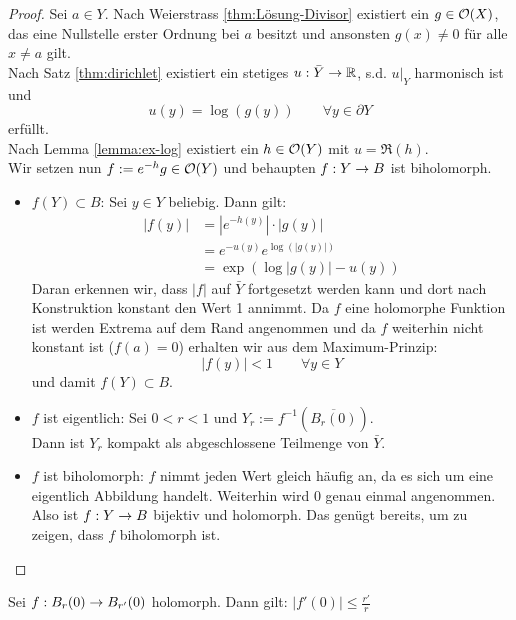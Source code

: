 \begin{proof}
  Sei $a \in Y$. Nach Weierstrass \ref{thm:Lösung-Divisor} existiert ein $g \in
  \mathcal{O}(X)$, das eine Nullstelle erster Ordnung bei $a$ besitzt und
  ansonsten $g(x) \neq 0$ für alle $x \neq a$ gilt. \\
  Nach Satz \ref{thm:dirichlet} existiert ein stetiges $u: \bar Y \rightarrow
  \mathbb{R}$, s.d. $u|_Y$ harmonisch ist und
  \[
  u(y) = \log(g(y)) \qquad \forall y \in \partial Y
  \]
  erfüllt. \\
  Nach Lemma \ref{lemma:ex-log} existiert ein $h \in \mathcal{O}(Y)$ mit $u =
  \Re(h)$. \\
  Wir setzen nun $f := e^{-h} g \in \mathcal{O}(Y)$ und behaupten $f: Y \rightarrow
  B$ ist biholomorph.
  \begin{itemize}
  \item $f(Y) \subset B$: Sei $y \in Y$ beliebig. Dann gilt:
    \begin{align*}
      |f(y)| & = | e^{-h(y)} | \cdot | g(y)| \\
      & = e^{-u(y)} e^{\log(|g(y)|)} \\
      & = \exp(\log|g(y)| - u(y))
    \end{align*}
    Daran erkennen wir, dass $|f|$ auf $\bar Y$ fortgesetzt werden
    kann und dort nach Konstruktion konstant den Wert 1 annimmt. Da
    $f$ eine holomorphe Funktion ist werden Extrema auf dem Rand
    angenommen und da $f$ weiterhin nicht konstant ist ($f(a) = 0$)
    erhalten wir aus dem Maximum-Prinzip:
    \[
    |f(y)| < 1 \qquad \forall y \in Y
    \]
    und damit $f(Y) \subset B$.
  \item $f$ ist eigentlich: Sei $0 < r < 1$ und $Y_r :=
    f^{-1}(\overline{B_r(0)})$. \\
    Dann ist $Y_r$ kompakt als abgeschlossene Teilmenge von $\bar Y$.
  \item $f$ ist biholomorph: $f$ nimmt jeden Wert gleich häufig an, da
    es sich um eine eigentlich Abbildung handelt. Weiterhin wird $0$
    genau einmal angenommen. Also ist $f: Y \rightarrow B$ bijektiv und
    holomorph. Das genügt bereits, um zu zeigen, dass $f$ biholomorph
    ist. 

  \end{itemize}

\end{proof}

\begin{prop}
  \label{prop:kreis}
  Sei $f: B_r(0) \rightarrow B_{r'}(0)$ holomorph. Dann gilt: $|f'(0)| \leq \frac{r'}{r}$
\end{prop}

